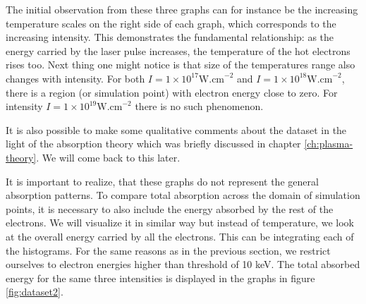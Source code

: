 The initial observation from these three graphs can for instance be the increasing temperature scales on the right side of each graph, which corresponds to the increasing intensity. This demonstrates the fundamental relationship: as the energy carried by the laser pulse increases, the temperature of the hot electrons rises too. Next thing one might notice is that size of the temperatures range also changes with intensity. For both $I = 1 \times 10^{17} \mathrm{W.cm}^{-2}$ and $I = 1 \times 10^{18} \mathrm{W.cm}^{-2}$, there is a region (or simulation point) with electron energy close to zero. For intensity $I = 1 \times 10^{19} \mathrm{W.cm}^{-2}$ there is no such phenomenon. 

It is also possible to make some qualitative comments about the dataset in the light of the absorption theory which was briefly discussed in chapter \ref{ch:plasma-theory}. We will come back to this later.

It is important to realize, that these graphs do not represent the general absorption patterns. To compare total absorption across the domain of simulation points, it is necessary to also include the energy absorbed by the rest of the electrons. We will visualize it in similar way but instead of temperature, we look at the overall energy carried by all the electrons. This can be integrating each of the histograms. For the same reasons as in the previous section, we restrict ourselves to electron energies higher than threshold of 10 keV. The total absorbed energy for the same three intensities is displayed in the graphs in figure \ref{fig:dataset2}.

